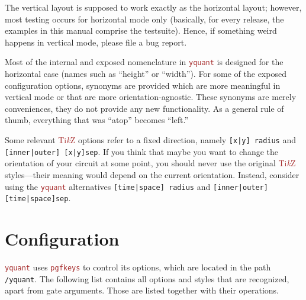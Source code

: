 \documentclass{scrartcl}
\makeatletter
\def\TikZ{\textcolor{brown}{Ti\textit kZ}}
\def\pkg#1{\textcolor{brown}{\texttt{#1}}}
\def\Yquant{\pkg{yquant}}
\newcommand*{\the@orig@section}{}
\let\the@orig@section=\section
\renewcommand*{\section}{%
   \clearpage%
   \the@orig@section%
}
\makeatother
\begin{document}
         The vertical layout is supposed to work exactly as the horizontal layout; however, most testing occurs for horizontal mode only (basically, for every release, the examples in this manual comprise the testsuite).
         Hence, if something weird happens in vertical mode, please file a bug report.

         Most of the internal and exposed nomenclature in \Yquant{} is designed for the horizontal case (names such as ``height'' or ``width'').
         For some of the exposed configuration options, synonyms are provided which are more meaningful in vertical mode or that are more orientation\hyp agnostic.
         These synonyms are merely conveniences, they do not provide any new functionality.
         As a general rule of thumb, everything that was ``atop'' becomes ``left.''

         Some relevant \TikZ{} options refer to a fixed direction, namely \texttt{[x|y] radius} and \texttt{[inner|outer] [x|y]sep}.
         If you think that maybe you want to change the orientation of your circuit at some point, you should never use the original \TikZ{} styles---their meaning would depend on the current orientation.
         Instead, consider using the \Yquant{} alternatives \texttt{[time|space] radius} and \texttt{[inner|outer] [time|space]sep}.

   \section{Configuration}\label{sec:config}
      \Yquant{} uses \pkg{pgfkeys} to control its options, which are located in the path \texttt{/yquant}.
      The following list contains all options and styles that are recognized, apart from gate arguments.
      Those are listed together with their operations.
\end{document}
